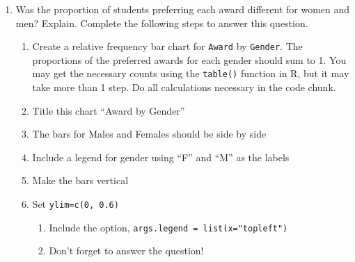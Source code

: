 \documentclass[]{article}
\newenvironment{Shaded}{\begin{snugshade}}{\end{snugshade}}
\newcommand{\DataTypeTok}[1]{\textcolor[rgb]{0.13,0.29,0.53}{#1}}
\newcommand{\DecValTok}[1]{\textcolor[rgb]{0.00,0.00,0.81}{#1}}
\newcommand{\FloatTok}[1]{\textcolor[rgb]{0.00,0.00,0.81}{#1}}
\newcommand{\KeywordTok}[1]{\textcolor[rgb]{0.13,0.29,0.53}{\textbf{#1}}}
\newcommand{\NormalTok}[1]{#1}
\newcommand{\OperatorTok}[1]{\textcolor[rgb]{0.81,0.36,0.00}{\textbf{#1}}}
\newcommand{\StringTok}[1]{\textcolor[rgb]{0.31,0.60,0.02}{#1}}
\providecommand{\tightlist}{%
  \setlength{\itemsep}{0pt}\setlength{\parskip}{0pt}}
\begin{document}
\begin{enumerate}
\def\labelenumi{\alph{enumi})}
\setcounter{enumi}{1}
\tightlist
\item
  Was the proportion of students preferring each award different for
  women and men? Explain. Complete the following steps to answer this
  question.

  \begin{enumerate}
  \def\labelenumii{\roman{enumii}.}
  \tightlist
  \item
    Create a relative frequency bar chart for \texttt{Award} by
    \texttt{Gender}. The proportions of the preferred awards for each
    gender should sum to 1. You may get the necessary counts using the
    \texttt{table()} function in R, but it may take more than 1 step. Do
    all calculations necessary in the code chunk.
  \item
    Title this chart ``Award by Gender''
  \item
    The bars for Males and Females should be side by side
  \item
    Include a legend for gender using ``F'' and ``M'' as the labels
  \item
    Make the bars vertical
  \item
    Set \texttt{ylim=c(0,\ 0.6)}

    \begin{enumerate}
    \def\labelenumiii{\roman{enumiii}.}
    \setcounter{enumiii}{6}
    \tightlist
    \item
      Include the option, \texttt{args.legend\ =\ list(x="topleft")}
    \item
      Don't forget to answer the question!
    \end{enumerate}
  \end{enumerate}
\end{enumerate}

\begin{Shaded}
\end{Shaded}
\end{document}
